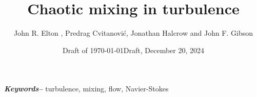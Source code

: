 \documentclass[lineno]{jfm}
\providecommand{\keywords}[1]
{
  \small	
  \textbf{\emph{Keywords--}} #1
}
\begin{document}
        \ifboyscout
\date{{\color{blue}Draft of \today}} %
        \else
\date{Draft, December 20, 2024}
        \fi 

\title[Mixing in {\pC} turbulence]
      {Chaotic mixing in {\pC} turbulence}


\author[J. R. Elton, P. Cvitanovi\'c, J. Halcrow and J. F. Gibson]
        {John R. Elton
            , 
            Predrag Cvitanovi\'c, 
            Jonathan Halcrow 
            and 
            John F. Gibson
        }


\maketitle

\begin{abstract}    %
    
\end{abstract}       %

\keywords{turbulence, mixing, {\pC} flow, Navier-Stokes}


     

     
\end{document}
